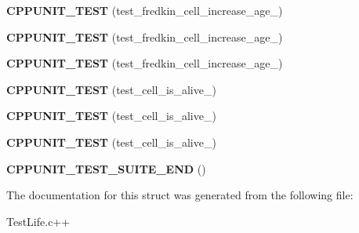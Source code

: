 \begin{DoxyCompactItemize}
\item 
\hypertarget{structTestLife_a73717ea9a95c21eea2c2285b644ce7b7}{{\bfseries \-C\-P\-P\-U\-N\-I\-T\-\_\-\-T\-E\-S\-T} (test\-\_\-fredkin\-\_\-cell\-\_\-increase\-\_\-age\-\_)}\label{structTestLife_a73717ea9a95c21eea2c2285b644ce7b7}

\item 
\hypertarget{structTestLife_ae98b58ec5020897b96fc0e5f120c1822}{{\bfseries \-C\-P\-P\-U\-N\-I\-T\-\_\-\-T\-E\-S\-T} (test\-\_\-fredkin\-\_\-cell\-\_\-increase\-\_\-age\-\_)}\label{structTestLife_ae98b58ec5020897b96fc0e5f120c1822}

\item 
\hypertarget{structTestLife_a6d6762bb2b2ae17c6a5f34c255b51488}{{\bfseries \-C\-P\-P\-U\-N\-I\-T\-\_\-\-T\-E\-S\-T} (test\-\_\-fredkin\-\_\-cell\-\_\-increase\-\_\-age\-\_)}\label{structTestLife_a6d6762bb2b2ae17c6a5f34c255b51488}

\item 
\hypertarget{structTestLife_af2725494e9682861a1ea9e3af11ad30f}{{\bfseries \-C\-P\-P\-U\-N\-I\-T\-\_\-\-T\-E\-S\-T} (test\-\_\-cell\-\_\-is\-\_\-alive\-\_)}\label{structTestLife_af2725494e9682861a1ea9e3af11ad30f}

\item 
\hypertarget{structTestLife_a9d3eb2adc81b6256cc72c3cece0cf796}{{\bfseries \-C\-P\-P\-U\-N\-I\-T\-\_\-\-T\-E\-S\-T} (test\-\_\-cell\-\_\-is\-\_\-alive\-\_)}\label{structTestLife_a9d3eb2adc81b6256cc72c3cece0cf796}

\item 
\hypertarget{structTestLife_ae4c1f9078835a0b3fcd4a2f4c3be9e28}{{\bfseries \-C\-P\-P\-U\-N\-I\-T\-\_\-\-T\-E\-S\-T} (test\-\_\-cell\-\_\-is\-\_\-alive\-\_)}\label{structTestLife_ae4c1f9078835a0b3fcd4a2f4c3be9e28}

\item 
\hypertarget{structTestLife_a870956089ec2afb3e839ed9d3c8537ec}{{\bfseries \-C\-P\-P\-U\-N\-I\-T\-\_\-\-T\-E\-S\-T\-\_\-\-S\-U\-I\-T\-E\-\_\-\-E\-N\-D} ()}\label{structTestLife_a870956089ec2afb3e839ed9d3c8537ec}

\end{DoxyCompactItemize}


\-The documentation for this struct was generated from the following file\-:\begin{DoxyCompactItemize}
\item 
\-Test\-Life.\-c++\end{DoxyCompactItemize}
